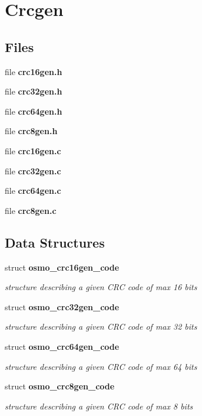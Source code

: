 \section{Crcgen}
\label{group__crcgen}
\subsection*{Files}
\begin{DoxyCompactItemize}
\item 
file \textbf{ crc16gen.\+h}
\item 
file \textbf{ crc32gen.\+h}
\item 
file \textbf{ crc64gen.\+h}
\item 
file \textbf{ crc8gen.\+h}
\item 
file \textbf{ crc16gen.\+c}
\item 
file \textbf{ crc32gen.\+c}
\item 
file \textbf{ crc64gen.\+c}
\item 
file \textbf{ crc8gen.\+c}
\end{DoxyCompactItemize}
\subsection*{Data Structures}
\begin{DoxyCompactItemize}
\item 
struct \textbf{ osmo\+\_\+crc16gen\+\_\+code}
\begin{DoxyCompactList}\small\item\em structure describing a given C\+RC code of max 16 bits \end{DoxyCompactList}\item 
struct \textbf{ osmo\+\_\+crc32gen\+\_\+code}
\begin{DoxyCompactList}\small\item\em structure describing a given C\+RC code of max 32 bits \end{DoxyCompactList}\item 
struct \textbf{ osmo\+\_\+crc64gen\+\_\+code}
\begin{DoxyCompactList}\small\item\em structure describing a given C\+RC code of max 64 bits \end{DoxyCompactList}\item 
struct \textbf{ osmo\+\_\+crc8gen\+\_\+code}
\begin{DoxyCompactList}\small\item\em structure describing a given C\+RC code of max 8 bits \end{DoxyCompactList}\end{DoxyCompactItemize}
